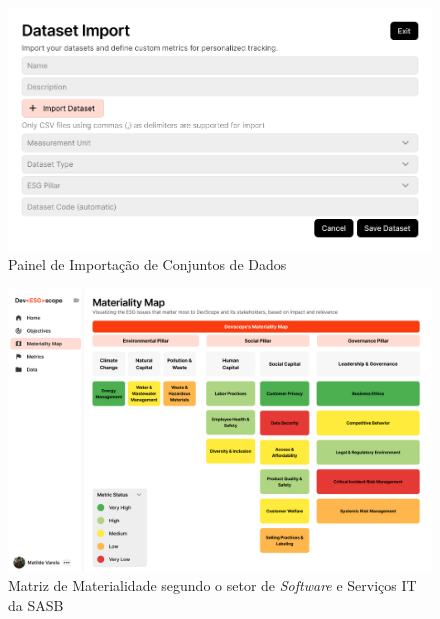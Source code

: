 \begin{figure}[H]
    \centering
    \includegraphics[width=\linewidth]{frontmatter/assets/mockup/Data Import.png}
    \caption{Painel de Importação de Conjuntos de Dados}
    \label{fig:importDatasetModal}
\end{figure}


\begin{figure}[H]
    \centering
    \includegraphics[width=\linewidth]{frontmatter/assets/mockup/Matrix.png}
    \caption{Matriz de Materialidade segundo o setor de \textit{Software} e Serviços IT da \gls{SASB}}
    \label{fig:matrixPage}
\end{figure}


